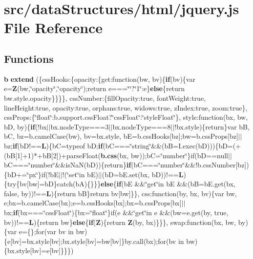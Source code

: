 \section{src/data\-Structures/html/jquery.js File Reference}
\label{data_structures_2html_2jquery_8js}
\subsection*{Functions}
\begin{DoxyCompactItemize}
\item 
{\bf b} {\bf extend} (\{css\-Hooks\-:\{opacity\-:\{get\-:function(bw, bv)\{{\bf if}(bv)\{var e={\bf Z}(bw,\char`\"{}opacity\char`\"{},\char`\"{}opacity\char`\"{});return e===\char`\"{}\char`\"{}?\char`\"{}1\char`\"{}\-:e\}{\bf else}\{return bw.\-style.\-opacity\}\}\}\}, css\-Number\-:\{fill\-Opacity\-:true, font\-Weight\-:true, line\-Height\-:true, opacity\-:true, orphans\-:true, widows\-:true, z\-Index\-:true, zoom\-:true\}, css\-Props\-:\{\char`\"{}float\char`\"{}\-:b.\-support.\-css\-Float?\char`\"{}css\-Float\char`\"{}\-:\char`\"{}style\-Float\char`\"{}\}, style\-:function(bx, bw, b\-D, by)\{{\bf if}(!bx$\vert$$\vert$bx.\-node\-Type===3$\vert$$\vert$bx.\-node\-Type===8$\vert$$\vert$!bx.\-style)\{return\}var b\-B, b\-C, bz=b.\-camel\-Case(bw), bv=bx.\-style, b\-E=b.\-css\-Hooks[bz];bw=b.\-css\-Props[bz]$\vert$$\vert$bz;{\bf if}(b\-D!=={\bf L})\{b\-C=typeof b\-D;{\bf if}(b\-C===\char`\"{}string\char`\"{}\&\&(b\-B=I.\-exec(b\-D)))\{b\-D=(+(b\-B[1]+1)$\ast$+b\-B[2])+parse\-Float({\bf b.\-css}(bx, bw));b\-C=\char`\"{}number\char`\"{}\}if(b\-D==null$\vert$$\vert$b\-C===\char`\"{}number\char`\"{}\&\&is\-Na\-N(b\-D))\{return\}{\bf if}(b\-C===\char`\"{}number\char`\"{}\&\&!b.\-css\-Number[bz])\{b\-D+=\char`\"{}px\char`\"{}\}if(!b\-E$\vert$$\vert$!(\char`\"{}set\char`\"{}in b\-E)$\vert$$\vert$(b\-D=b\-E.\-set(bx, b\-D))!=={\bf L})\{try\{bv[bw]=b\-D\}catch(b\-A)\{\}\}\}{\bf else}\{{\bf if}(b\-E \&\&\char`\"{}get\char`\"{}in b\-E \&\&(b\-B=b\-E.\-get(bx, false, by))!=={\bf L})\{return b\-B\}return bv[bw]\}\}, css\-:function(by, bx, bv)\{var bw, e;bx=b.\-camel\-Case(bx);e=b.\-css\-Hooks[bx];bx=b.\-css\-Props[bx]$\vert$$\vert$bx;{\bf if}(bx===\char`\"{}css\-Float\char`\"{})\{bx=\char`\"{}float\char`\"{}\}if(e \&\&\char`\"{}get\char`\"{}in e \&\&(bw=e.\-get(by, true, bv))!=={\bf L})\{return bw\}{\bf else}\{{\bf if}({\bf Z})\{return {\bf Z}(by, bx)\}\}\}, swap\-:function(bx, bw, by)\{var e=\{\};for(var bv in bw)\{e[bv]=bx.\-style[bv];bx.\-style[bv]=bw[bv]\}by.\-call(bx);for(bv in bw)\{bx.\-style[bv]=e[bv]\}\}\})

\end{DoxyCompactItemize}
